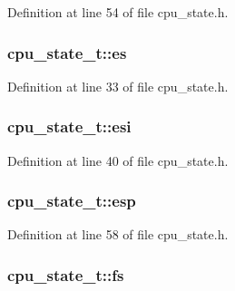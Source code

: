 \-Definition at line 54 of file cpu\-\_\-state.\-h.

\hypertarget{structcpu__state__t_a4efb520b83ac96614301f0cff941be2d}{
\subsubsection[{es}]{ {\bf cpu\-\_\-state\-\_\-t\-::es}}}\label{structcpu__state__t_a4efb520b83ac96614301f0cff941be2d}


\-Definition at line 33 of file cpu\-\_\-state.\-h.

\hypertarget{structcpu__state__t_a2830de4c04946b1ab58751997e5586c5}{
\subsubsection[{esi}]{ {\bf cpu\-\_\-state\-\_\-t\-::esi}}}\label{structcpu__state__t_a2830de4c04946b1ab58751997e5586c5}


\-Definition at line 40 of file cpu\-\_\-state.\-h.

\hypertarget{structcpu__state__t_ac3816814c0e87a068d1e11753329b015}{
\subsubsection[{esp}]{ {\bf cpu\-\_\-state\-\_\-t\-::esp}}}\label{structcpu__state__t_ac3816814c0e87a068d1e11753329b015}


\-Definition at line 58 of file cpu\-\_\-state.\-h.

\hypertarget{structcpu__state__t_ac75642639a79d74455af58d5a45932c2}{
\subsubsection[{fs}]{ {\bf cpu\-\_\-state\-\_\-t\-::fs}}}\label{structcpu__state__t_ac75642639a79d74455af58d5a45932c2}


